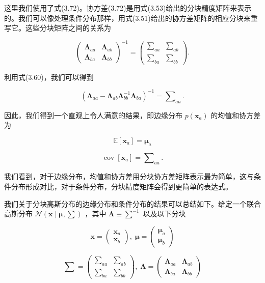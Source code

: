 \documentclass[10pt]{article}
\begin{document}
这里我们使用了式(3.72)。协方差(3.72)是用式(3.53)给出的分块精度矩阵来表示的。我们可以像处理条件分布那样，用式(3.51)给出的协方差矩阵的相应分块来重写它。这些分块矩阵之间的关系为

\[
{\left( \begin{array}{ll} {\mathbf{\Lambda }}_{aa} & {\mathbf{\Lambda }}_{ab} \\  {\mathbf{\Lambda }}_{ba} & {\mathbf{\Lambda }}_{bb} \end{array}\right) }^{-1} = \left( \begin{array}{ll} {\mathbf{\sum }}_{aa} & {\mathbf{\sum }}_{ab} \\  {\mathbf{\sum }}_{ba} & {\mathbf{\sum }}_{bb} \end{array}\right) . \tag{3.74}
\]

利用式(3.60)，我们可以得到

\[
{\left( {\mathbf{\Lambda }}_{aa} - {\mathbf{\Lambda }}_{ab}{\mathbf{\Lambda }}_{bb}^{-1}{\mathbf{\Lambda }}_{ba}\right) }^{-1} = {\mathbf{\sum }}_{aa}. \tag{3.75}
\]

因此，我们得到一个直观上令人满意的结果，即边缘分布 \(p\left( {\mathbf{x}}_{a}\right)\) 的均值和协方差为

\[
\mathbb{E}\left\lbrack  {\mathbf{x}}_{a}\right\rbrack   = {\mathbf{\mu }}_{a} \tag{3.76}
\]

\[
\operatorname{cov}\left\lbrack  {\mathbf{x}}_{a}\right\rbrack   = {\mathbf{\sum }}_{aa}. \tag{3.77}
\]

我们看到，对于边缘分布，均值和协方差用分块协方差矩阵表示最为简单，这与条件分布形成对比，对于条件分布，分块精度矩阵会得到更简单的表达式。

我们关于分块高斯分布的边缘分布和条件分布的结果可以总结如下。给定一个联合高斯分布 \(\mathcal{N}\left( {\mathbf{x} \mid  \mathbf{\mu },\mathbf{\sum }}\right)\) ，其中 \(\mathbf{\Lambda } \equiv  {\mathbf{\sum }}^{-1}\) 以及以下分块

\[
\mathbf{x} = \left( \begin{array}{l} {\mathbf{x}}_{a} \\  {\mathbf{x}}_{b} \end{array}\right) ,\;\mathbf{\mu } = \left( \begin{array}{l} {\mathbf{\mu }}_{a} \\  {\mathbf{\mu }}_{b} \end{array}\right)  \tag{3.78}
\]

\[
\mathbf{\sum } = \left( \begin{array}{ll} {\mathbf{\sum }}_{aa} & {\mathbf{\sum }}_{ab} \\  {\mathbf{\sum }}_{ba} & {\mathbf{\sum }}_{bb} \end{array}\right) ,\;\mathbf{\Lambda } = \left( \begin{array}{ll} {\mathbf{\Lambda }}_{aa} & {\mathbf{\Lambda }}_{ab} \\  {\mathbf{\Lambda }}_{ba} & {\mathbf{\Lambda }}_{bb} \end{array}\right)  \tag{3.79}
\]
\end{document}
